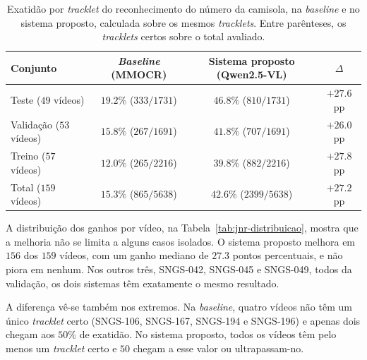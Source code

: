 \begin{table}[H]
    \centering
    \caption{Exatidão por \emph{tracklet} do reconhecimento do número da camisola, na \emph{baseline} e no sistema proposto, calculada sobre os mesmos \emph{tracklets}. Entre parênteses, os \emph{tracklets} certos sobre o total avaliado.}
    \label{tab:jnr}
    \begin{tabular}{|l|c|c|c|}
        \hline
        \textbf{Conjunto} & \textbf{\emph{Baseline} (MMOCR)} & \textbf{Sistema proposto (Qwen2.5-VL)} & \textbf{$\Delta$} \\
        \hline
        Teste ($49$ vídeos)     & $19.2\%$ ($333/1731$) & $46.8\%$ ($810/1731$)   & $+27.6$ pp \\
        \hline
        Validação ($53$ vídeos) & $15.8\%$ ($267/1691$) & $41.8\%$ ($707/1691$)   & $+26.0$ pp \\
        \hline
        Treino ($57$ vídeos)    & $12.0\%$ ($265/2216$) & $39.8\%$ ($882/2216$)   & $+27.8$ pp \\
        \hline
        Total ($159$ vídeos)    & $15.3\%$ ($865/5638$) & $42.6\%$ ($2399/5638$)  & $+27.2$ pp \\
        \hline
    \end{tabular}
\end{table}

A distribuição dos ganhos por vídeo, na Tabela~\ref{tab:jnr-distribuicao}, mostra que a melhoria não se limita a alguns casos isolados. O sistema proposto melhora em $156$ dos $159$ vídeos, com um ganho mediano de $27.3$ pontos percentuais, e não piora em nenhum. Nos outros três, SNGS-042, SNGS-045 e SNGS-049, todos da validação, os dois sistemas têm exatamente o mesmo resultado.

A diferença vê-se também nos extremos. Na \emph{baseline}, quatro vídeos não têm um único \emph{tracklet} certo (SNGS-106, SNGS-167, SNGS-194 e SNGS-196) e apenas dois chegam aos $50\%$ de exatidão. No sistema proposto, todos os vídeos têm pelo menos um \emph{tracklet} certo e $50$ chegam a esse valor ou ultrapassam-no.


